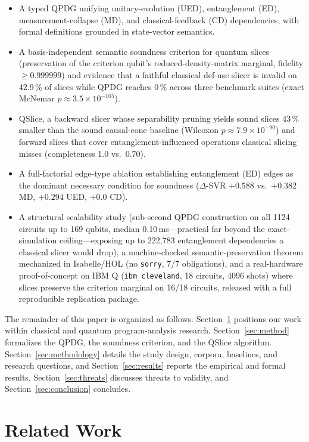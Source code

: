 \documentclass[10pt,conference]{IEEEtran}
\theoremstyle{definition}
\begin{document}
\begin{itemize}
  \item A typed QPDG unifying unitary-evolution (UED), entanglement (ED), measurement-collapse (MD), and classical-feedback (CD) dependencies, with formal definitions grounded in state-vector semantics.
  \item A basis-independent semantic soundness criterion for quantum slices (preservation of the criterion qubit's reduced-density-matrix marginal, fidelity $\geq 0.999999$) and evidence that a faithful classical def-use slicer is invalid on 42.9\,\% of slices while QPDG reaches 0\,\% across three benchmark suites (exact McNemar $p\approx3.5\times10^{-105}$).
  \item QSlice, a backward slicer whose separability pruning yields sound slices 43\,\% smaller than the sound causal-cone baseline (Wilcoxon $p\approx7.9\times10^{-90}$) and forward slices that cover entanglement-influenced operations classical slicing misses (completeness 1.0 vs.\ 0.70).
  \item A full-factorial edge-type ablation establishing entanglement (ED) edges as the dominant necessary condition for soundness ($\Delta$-SVR $+0.588$ vs.\ $+0.382$ MD, $+0.294$ UED, $+0.0$ CD).
  \item A structural scalability study (sub-second QPDG construction on all 1124 circuits up to 169 qubits, median 0.10\,ms---practical far beyond the exact-simulation ceiling---exposing up to 222{,}783 entanglement dependencies a classical slicer would drop), a machine-checked semantic-preservation theorem mechanized in Isabelle/HOL (no \texttt{sorry}, 7/7 obligations), and a real-hardware proof-of-concept on IBM Q (\texttt{ibm\_cleveland}, 18 circuits, 4096 shots) where slices preserve the criterion marginal on 16/18 circuits, released with a full reproducible replication package.
\end{itemize}

The remainder of this paper is organized as follows. Section~\ref{sec:related} positions our work within classical and quantum program-analysis research. Section~\ref{sec:method} formalizes the QPDG, the soundness criterion, and the QSlice algorithm. Section~\ref{sec:methodology} details the study design, corpora, baselines, and research questions, and Section~\ref{sec:results} reports the empirical and formal results. Section~\ref{sec:threats} discusses threats to validity, and Section~\ref{sec:conclusion} concludes.

\section{Related Work}\label{sec:related}
\end{document}

